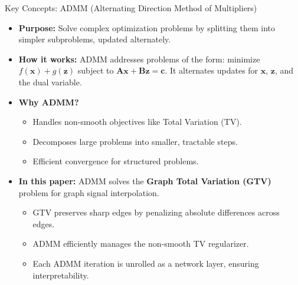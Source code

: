 \documentclass[aspectratio=169,xcolor=dvipsnames]{beamer}
\begin{document}
\begin{frame}{Key Concepts: ADMM (Alternating Direction Method of Multipliers)}

\begin{itemize}

    \item \textbf{Purpose:}  
    Solve complex optimization problems by splitting them into simpler subproblems, updated alternately.

    \vspace{0.2cm}

    \item \textbf{How it works:}  
    ADMM addresses problems of the form:  
    minimize \( f(\mathbf{x}) + g(\mathbf{z}) \)  
    subject to \( \mathbf{A}\mathbf{x} + \mathbf{B}\mathbf{z} = \mathbf{c} \).  
    It alternates updates for \(\mathbf{x}\), \(\mathbf{z}\), and the dual variable.

    \vspace{0.2cm}

    \item \textbf{Why ADMM?}  
    \begin{itemize}
        \item Handles non-smooth objectives like Total Variation (TV).
        \item Decomposes large problems into smaller, tractable steps.
        \item Efficient convergence for structured problems.
    \end{itemize}

    \vspace{0.2cm}

    \item \textbf{In this paper:}  
    ADMM solves the \textbf{Graph Total Variation (GTV)} problem for graph signal interpolation.  
    \begin{itemize}
        \item GTV preserves sharp edges by penalizing absolute differences across edges.
        \item ADMM efficiently manages the non-smooth TV regularizer.
        \item Each ADMM iteration is unrolled as a network layer, ensuring interpretability.
    \end{itemize}

\end{itemize}

\end{frame}
\end{document}
